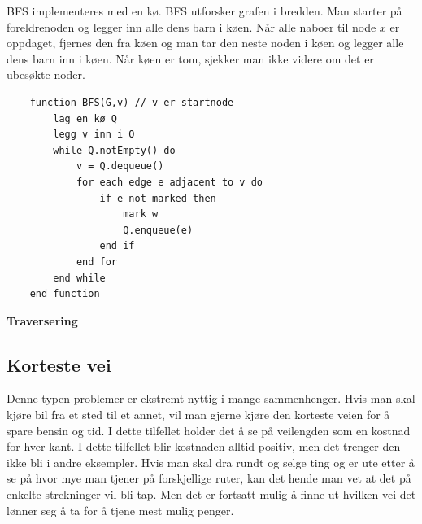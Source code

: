 BFS implementeres med en kø. BFS utforsker grafen i bredden. Man starter på foreldrenoden og legger inn alle dens barn i køen. Når alle naboer til node $x$ er oppdaget, fjernes den fra køen og man tar den neste noden i køen og legger alle dens barn inn i køen. Når køen er tom, sjekker man ikke videre om det er ubesøkte noder.

\begin{lstlisting}
    function BFS(G,v) // v er startnode
	    lag en kø Q
    	legg v inn i Q
    	while Q.notEmpty() do
    		v = Q.dequeue()
    		for each edge e adjacent to v do
    			if e not marked then
    				mark w
    				Q.enqueue(e)
    			end if
    		end for
    	end while
    end function

\end{lstlisting}


\noindent \textbf{Traversering}

\subsection{Korteste vei}
Denne typen problemer er ekstremt nyttig i mange sammenhenger. Hvis man skal kjøre bil fra et sted til et annet, vil man gjerne kjøre den korteste veien for å spare bensin og tid. I dette tilfellet holder det å se på veilengden som en kostnad for hver kant. I dette tilfellet blir kostnaden alltid positiv, men det trenger den ikke bli i andre eksempler. Hvis man skal dra rundt og selge ting og er ute etter å se på hvor mye man tjener på forskjellige ruter, kan det hende man vet at det på enkelte strekninger vil bli tap. Men det er fortsatt mulig å finne ut hvilken vei det lønner seg å ta for å tjene mest mulig penger.

